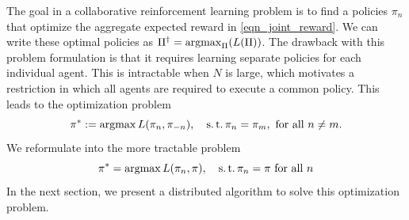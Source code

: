 \documentclass{article}
\begin{document}
The goal in a collaborative reinforcement learning problem is to find a policies $\pi_n$ that optimize the aggregate expected reward in \eqref{eqn_joint_reward}. We can write these optimal policies as $\Pi^\dagger = \argmax_\Pi (L(\Pi))$. The drawback with this problem formulation is that it requires learning separate policies for each individual agent. This is intractable when $N$ is large, which motivates a restriction in which all agents are required to execute a common policy. This leads to the optimization problem  
%
\begin{equation}\label{eqn_optimization_premliminary}
   \pi^* :=  \argmax  L(\pi_n, \pi_{-n}), \quad 
             \st      \pi_n = \pi_m, \text{\ for all\ } n\neq m.
\end{equation}
%
We reformulate into the more tractable problem
%
\begin{equation}\label{eqn_optimization}
   \pi^* =  \argmax  L (\pi_n, \pi), \quad 
           \st \pi_n = \pi \text{\ for all\ } n
\end{equation}
%
In the next section, we present a distributed algorithm to solve this optimization problem. 
\end{document}
